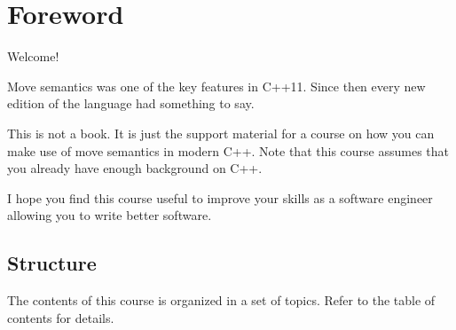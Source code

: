 \chapter*{Foreword}

Welcome!

Move semantics was one of the key features in C++11. Since then every 
new edition of the language had something to say.

This is not a book. It is just the support material for a course on how you can
make use of move semantics in modern C++. Note that this course assumes that you
already have enough background on C++.

I hope you find this course useful to improve your skills as a software
engineer allowing you to write better software.

\section*{Structure}

The contents of this course is organized in a set of topics. 
Refer to the table of contents for details.
